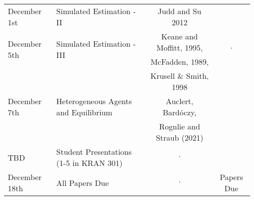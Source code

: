 \documentclass[a4paper]{article}
\begin{document}
\begin{table}[ht!]
\begin{tabular}{|l|l|c|c|}
\hline
\multirow{2}{*}{December 1st} & \multirow{2}{*}{Simulated Estimation - II} & \multirow{2}{*}{Judd and Su 2012} & \\
 &    &  &  \\
\hline
\multirow{2}{*}{December 5th} & \multirow{2}{*}{Simulated Estimation - III} &  Keane and Moffitt, 1995,  & \multirow{2}{*}{$\cdot$}\\
&   &  McFadden, 1989,  & \\
\hline
\multirow{3}{*}{December 7th} & \multirow{3}{*}{Heterogeneous Agents and Equilibrium} & Krusell \& Smith, 1998 & \\
 &  & Auclert, Bard\'{o}czy,  & \\
  &  &  Rognlie and Straub (2021) & \\
\hline
TBD & Student Presentations (1-5 in KRAN 301) & $\cdot$ & \\
\hline
December 18th & All Papers Due & $\cdot$ & Papers Due\\
\hline
\end{tabular}
\end{table}

\clearpage
\nocite{*}

\end{document}
